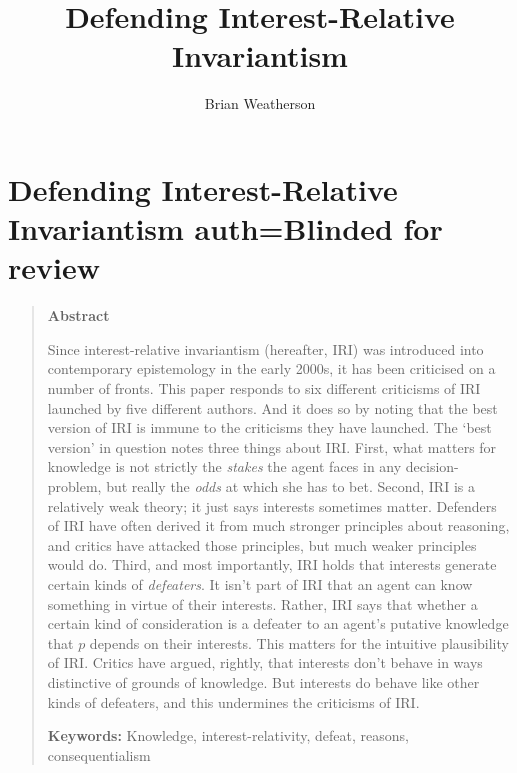 \documentclass[oneside, a4paper]{book}
\title{Defending Interest-Relative Invariantism}
\author{Brian Weatherson}
\begin{document}



\setcounter{paper}{0}

\chapter[Defending IRI]{Defending Interest-Relative Invariantism auth=Blinded for review}

\begin{quote}
\textbf{Abstract}

Since interest-relative invariantism (hereafter, IRI) was introduced into contemporary epistemology in the early 2000s, it has been criticised on a number of fronts. This paper responds to six different criticisms of IRI launched by five different authors. And it does so by noting that the best version of IRI is immune to the criticisms they have launched. The `best version' in question notes three things about IRI. First, what matters for knowledge is not strictly the \textit{stakes} the agent faces in any decision-problem, but really the \textit{odds} at which she has to bet. Second, IRI is a relatively weak theory; it just says interests sometimes matter. Defenders of IRI have often derived it from much stronger principles about reasoning, and critics have attacked those principles, but much weaker principles would do. Third, and most importantly, IRI holds that interests generate certain kinds of \textit{defeaters}. It isn't part of IRI that an agent can know something in virtue of their interests. Rather, IRI says that whether a certain kind of consideration is a defeater to an agent's putative knowledge that $p$ depends on their interests. This matters for the intuitive plausibility of IRI. Critics have argued, rightly, that interests don't behave in ways distinctive of grounds of knowledge. But interests do behave like other kinds of defeaters, and this undermines the criticisms of IRI.

\textbf{Keywords:} Knowledge, interest-relativity, defeat, reasons, consequentialism

\end{quote}
\end{document}
